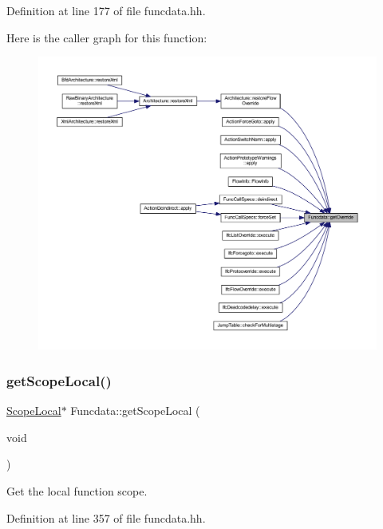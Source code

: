 Definition at line 177 of file funcdata.\+hh.

Here is the caller graph for this function\+:
\nopagebreak
\begin{figure}[H]
\begin{center}
\leavevmode
\includegraphics[width=350pt]{class_funcdata_ac48d087ed5fbf901cfa608d8f44b6d5c_icgraph}
\end{center}
\end{figure}
\mbox{\label{class_funcdata_aaa28789a086c52edd04c41e265818bbb}} 
\subsubsection{\texorpdfstring{getScopeLocal()}{getScopeLocal()}\hspace{0.1cm}{\footnotesize\ttfamily [1/2]}}
{\footnotesize\ttfamily \mbox{\hyperlink{class_scope_local}{Scope\+Local}}$\ast$ Funcdata\+::get\+Scope\+Local (\begin{DoxyParamCaption}\item[{void}]{ }\end{DoxyParamCaption})\hspace{0.3cm}{\ttfamily [inline]}}



Get the local function scope. 



Definition at line 357 of file funcdata.\+hh.

